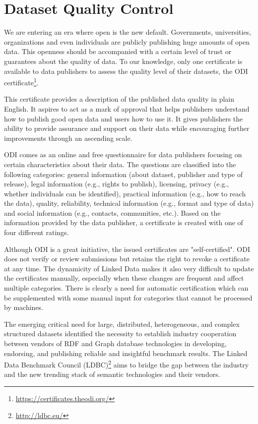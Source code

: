 \documentclass[onecolumn, crcready]{../../Util/LaTEX/iosart2c}
\begin{document}

\section{Dataset Quality Control}
\label{sec:dataset_quality_control}
We are entering an era where open is the new default. Governments, universities, organizations and even individuals are publicly publishing huge amounts of open data.  This openness should be accompanied with a certain level of trust or guarantees about the quality of data.  To our knowledge, only one certificate is available to data publishers to assess the quality level of their datasets, the ODI certificate\footnote{\url{https://certificates.theodi.org/}}.

This certificate provides a description of the published data quality in plain English. It aspires to act as a mark of approval that helps publishers understand how to publish good open data and users how to use it. It gives publishers the ability to provide assurance and support on their data while encouraging further improvements through an ascending scale.

ODI comes as an online and free questionnaire for data publishers focusing on certain characteristics about their data. The questions are classified into the following categories: general information (about dataset, publisher and type of release), legal information (e.g., rights to publish), licensing, privacy (e.g., whether individuals can be identified), practical information (e.g., how to reach the data), quality, reliability, technical information (e.g., format and type of data) and social information (e.g., contacts, communities, etc.). Based on the information provided  by the data  publisher,  a certificate  is created  with one of four different ratings.

Although ODI is a great initiative, the issued certificates are "self-certified". ODI does not verify or review submissions but retains the right to revoke a certificate at any time. The dynamicity of Linked Data  makes it also very difficult to update the certificates manually, especially when these changes are frequent and affect multiple categories. There is clearly a need for automatic certification which can be supplemented with some manual input for categories that cannot be processed by machines.


The emerging critical need for large, distributed, heterogeneous, and complex structured datasets identified the necessity to establish industry cooperation between vendors of RDF and Graph database technologies in developing, endorsing, and publishing reliable and insightful benchmark results. The Linked Data Benchmark Council (LDBC)\footnote{\url{http://ldbc.eu/}} aims to bridge the gap between the industry and the new trending stack of semantic technologies and their vendors.
\end{document}
